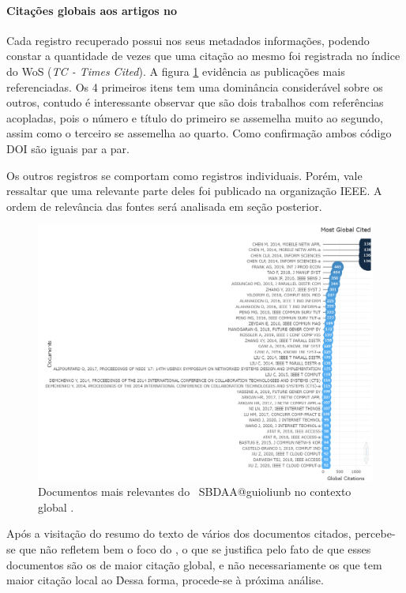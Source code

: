 \paragraph{Citações globais aos artigos no \dataset}

Cada registro recuperado possui nos seus metadados informações, podendo constar a quantidade de vezes que uma citação ao mesmo foi registrada no índice do WoS (\textit{TC - Times Cited}).
A figura \ref{fig:SBDAA@guioliunb:relevantdocuments} evidência as publicações mais referenciadas. Os 4 primeiros itens tem uma dominância considerável sobre os outros, contudo é interessante observar que são dois trabalhos com referências acopladas, pois o número e título do primeiro se assemelha muito ao segundo, assim como o terceiro se assemelha ao quarto. Como confirmação ambos código DOI são iguais par a par.

Os outros registros se comportam como registros individuais. Porém, vale ressaltar que uma relevante parte deles foi publicado na organização IEEE. A ordem de relevância das fontes será analisada em seção posterior.




\begin{figure}
    \centering
    \includegraphics[angle=0,width=1\textwidth]{experiments/guioliunb/AnaliseBibliometrica/SocialBigDataAnalysis/MOST GLOBAL CITED.png}
    \caption{Documentos mais relevantes do \dataset\ SBDAA@guioliunb no contexto global .}
    \label{fig:SBDAA@guioliunb:relevantdocuments}
\end{figure}

Após a visitação do resumo do texto de vários dos documentos citados, percebe-se que não refletem bem o foco do \dataset, o que se justifica pelo fato de que esses documentos são os de maior citação global, e não necessariamente os que tem maior citação local ao \dataset\. Dessa forma, procede-se à próxima análise.

